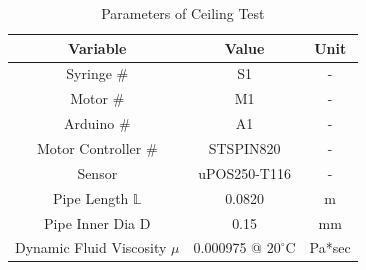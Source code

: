 \documentclass[journal]{IEEEtran}
\begin{document}
            \begin{table}[H]
                \renewcommand{\arraystretch}{1.3}
                \caption{Parameters of Ceiling Test}
                \label{table:test_param_ceiling}
                    \begin{center}
                        \begin{tabular}{|c|c|c|}
                            \hline
                            \bfseries Variable&
                            \bfseries Value&
                            \bfseries Unit
                            \\ \hline
                            
                            Syringe \#&
                            S1&
                            -
                            \\ \hline
                            
                            Motor \#&
                            M1&
                            -
                            \\ \hline
                            
                            Arduino \#&
                            A1&
                            -
                            \\ \hline
                            
                            Motor Controller \#&
                            STSPIN820&
                            -
                            \\ \hline
                            
                            Sensor&
                            uPOS250-T116&
                            -
                            \\ \hline
                            
                            Pipe Length \(\mathbb{L}\) &
                            0.0820&
                            m
                            \\ \hline
                            
                            Pipe Inner Dia D&
                            0.15&
                            mm
                            \\ \hline
                            
                            Dynamic Fluid Viscosity \(\mu\) &
                            0.000975 @ \(20^\circ\)C&
                            Pa*sec
                            \\ \hline
                            

\end{tabular}
\end{center}
\end{table}
\end{document}
